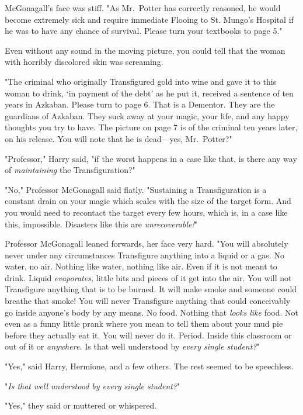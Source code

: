 McGonagall's face was stiff. "As Mr.~Potter has correctly reasoned, he would
become extremely sick and require immediate Flooing to St. Mungo's Hospital if
he was to have any chance of survival. Please turn your textbooks to page 5."

Even without any sound in the moving picture, you could tell that the woman
with horribly discolored skin was screaming.

"The criminal who originally Transfigured gold into wine and gave it to this
woman to drink, `in payment of the debt' as he put it, received a sentence of
ten years in Azkaban. Please turn to page 6. That is a Dementor. They are the
guardians of Azkaban. They suck away at your magic, your life, and any happy
thoughts you try to have. The picture on page 7 is of the criminal ten years
later, on his release. You will note that he is dead---yes, Mr.~Potter?"

"Professor," Harry said, "if the worst happens in a case like that, is there
any way of \emph{maintaining} the Transfiguration?"

"No," Professor McGonagall said flatly. "Sustaining a Transfiguration is a
constant drain on your magic which scales with the size of the target form. And
you would need to recontact the target every few hours, which is, in a case
like this, impossible. Disasters like this are \emph{unrecoverable!}"

Professor McGonagall leaned forwards, her face very hard. "You will absolutely
never under any circumstances Transfigure anything into a liquid or a gas. No
water, no air. Nothing like water, nothing like air. Even if it is not meant to
drink. Liquid \emph{evaporates,} little bits and pieces of it get into the air.
You will not Transfigure anything that is to be burned. It will make smoke and
someone could breathe that smoke! You will never Transfigure anything that
could conceivably go inside anyone's body by any means. No food. Nothing that
\emph{looks like} food. Not even as a funny little prank where you mean to tell
them about your mud pie before they actually eat it. You will never do it.
Period. Inside this classroom or out of it or \emph{anywhere.} Is that well
understood by \emph{every single student?}"

"Yes," said Harry, Hermione, and a few others. The rest seemed to be speechless.

"\emph{Is that well understood by every single student?}"

"Yes," they said or muttered or whispered.


